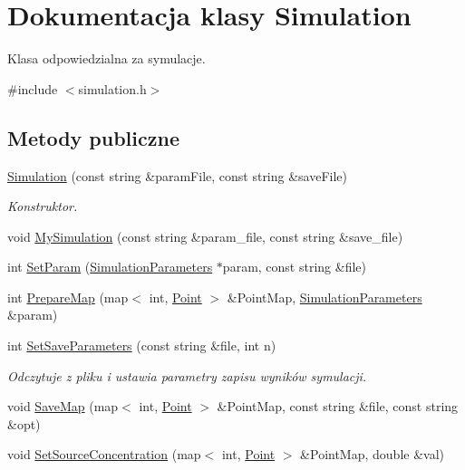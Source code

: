 \hypertarget{class_simulation}{}\section{Dokumentacja klasy Simulation}
\label{class_simulation}


Klasa odpowiedzialna za symulacje.  




{\ttfamily \#include $<$simulation.\+h$>$}

\subsection*{Metody publiczne}
\begin{DoxyCompactItemize}
\item 
\hyperlink{class_simulation_af6d6faabf99b4147db641658d1fcfc08}{Simulation} (const string \&param\+File, const string \&save\+File)
\begin{DoxyCompactList}\small\item\em Konstruktor. \end{DoxyCompactList}\item 
void \hyperlink{class_simulation_a900ea19845f934638b3e2cf755e14302}{My\+Simulation} (const string \&param\+\_\+file, const string \&save\+\_\+file)
\item 
int \hyperlink{class_simulation_ab76ff3b4cdd23182a21a69535c4b064b}{Set\+Param} (\hyperlink{class_simulation_parameters}{Simulation\+Parameters} $\ast$param, const string \&file)
\item 
int \hyperlink{class_simulation_a7f0f2ce0a990c9823748cee649224bfc}{Prepare\+Map} (map$<$ int, \hyperlink{class_point}{Point} $>$ \&Point\+Map, \hyperlink{class_simulation_parameters}{Simulation\+Parameters} \&param)
\item 
int \hyperlink{class_simulation_a01d0cc9ca7a6b8bb20504b0d303c077a}{Set\+Save\+Parameters} (const string \&file, int n)
\begin{DoxyCompactList}\small\item\em Odczytuje z pliku i ustawia parametry zapisu wyników symulacji. \end{DoxyCompactList}\item 
void \hyperlink{class_simulation_a471316287d132dba2d8dd10fbcc1a192}{Save\+Map} (map$<$ int, \hyperlink{class_point}{Point} $>$ \&Point\+Map, const string \&file, const string \&opt)
\item 
void \hyperlink{class_simulation_ac9b7432d7f91aaee99100187fac8d73e}{Set\+Source\+Concentration} (map$<$ int, \hyperlink{class_point}{Point} $>$ \&Point\+Map, double \&val)

\end{DoxyCompactItemize}
